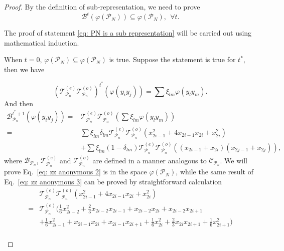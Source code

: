 \documentclass[showpacs,twocolumn,aps,prx,long bibliography,superscriptaddress,notitlepage]{revtex4-1}
\newcommand{\Tcal}{\mathcal{T}}
\begin{document}
\begin{proof}
    By the definition of sub-representation, we need to prove
    \begin{equation}
    \label{eq: PN is a sub representation}
         \mathcal{B}^t (\varphi(\mathcal{P}_N)) \subseteq \varphi(\mathcal{P}_N), ~~\forall t .
    \end{equation}

     The proof of statement \eqref{eq: PN is a sub representation} will be carried out using mathematical induction.
    
     When $t=0$, $\varphi(\mathcal{P}_N)\subseteq \varphi(\mathcal{P}_N)$ is true.
     Suppose the statement is true for $t^*$, then we have
     \begin{widetext}
         \begin{equation}
(\Tcal^{(e)}_{\mathcal{P}_n}\Tcal^{(o)}_{\mathcal{P}_n})^{t^*}(\varphi(y_iy_j)) = \sum \xi_{lm} \varphi(y_ly_m).
    \end{equation}
    And then
    \begin{align}
        \mathcal{B}_{\mathcal{P}_n}  ^{t^*+1}(\varphi(y_i y_j)) =& 
        \Tcal^{(e)}_{\mathcal{P}_n}\Tcal^{(o)}_{\mathcal{P}_n} (\sum \xi_{lm} \varphi(y_ly_m)) \\
        \label{eq: zz anonymous 2}
        =& \sum \xi_{lm} \delta_{lm}\Tcal^{(e)}_{\mathcal{P}_n}\Tcal^{(o)}_{\mathcal{P}_n} ( x_{2i-1}^2+4 x_{2i-1} x_{2i}+x_{2i}^2) \\
        \label{eq: zz anonymous 3}
        & + \sum \xi_{lm} (1-\delta_{lm})\Tcal^{(e)}_{\mathcal{P}_n}\Tcal^{(o)}_{\mathcal{P}_n}\left(\left(x_{2 i-1}+x_{2 i}\right)\left(x_{2 j-1}+x_{2 j}\right)\right),
    \end{align}
    where $\mathcal{B}_{\mathcal{P}_n}$,  $\Tcal^{(e)}_{\mathcal{P}_n}$ and $\Tcal^{(o)}_{\mathcal{P}_n}$ are defined in a manner analogous to $\mathcal{C}_{\mathcal{P}_n}$. 
    We will prove Eq.~\eqref{eq: zz anonymous 2} is in the space $\varphi(\mathcal{P}_N)$, while the same result of Eq.~\eqref{eq: zz anonymous 3} can be proved by straightforward calculation
    \begin{equation}
    \begin{aligned}
        \label{eq: zz anonymous 4}
        &\Tcal^{(e)}_{\mathcal{P}_n}\Tcal^{(o)}_{\mathcal{P}_n} ( x_{2i-1}^2+4 x_{2i-1} x_{2i}+x_{2i}^2) \\
        =& \Tcal^{(e)}_{\mathcal{P}_n}(\frac{1}{6}x_{2i-2}^2 + \frac{2}{3} x_{2i-2}x_{2i-1} + x_{2i-2}x_{2i}+x_{2i-2}x_{2i+1} \\
        &+\frac{1}{6} x_{2i-1}^2 + x_{2i-1}x_{2i} + x_{2i-1}x_{2i+1} +\frac{1}{6} x_{2i}^2 + \frac{2}{3} x_{2i}x_{2i+1} + \frac{1}{6}x_{2i+1}^2  )\\

\end{aligned}
\end{equation}
\end{widetext}
\end{proof}
\end{document}
